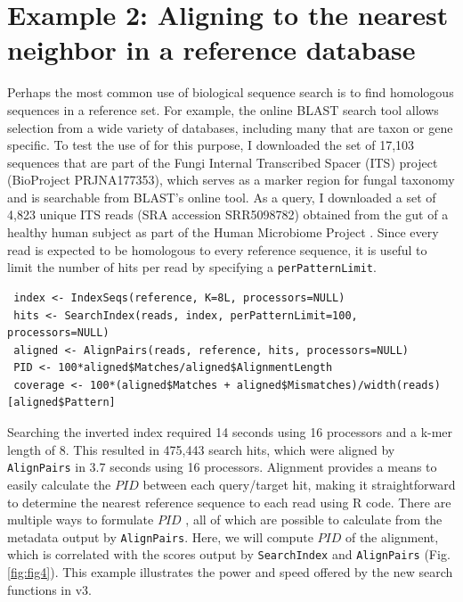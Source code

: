 \section{Example 2: Aligning to the nearest neighbor in a reference database}\label{example-2-aligning-to-the-nearest-neighbor-in-a-reference-database}

Perhaps the most common use of biological sequence search is to find homologous sequences in a reference set. For example, the online BLAST search tool allows selection from a wide variety of databases, including many that are taxon or gene specific. To test the use of  for this purpose, I downloaded the set of 17,103 sequences that are part of the Fungi Internal Transcribed Spacer (ITS) project (BioProject PRJNA177353), which serves as a marker region for fungal taxonomy \citep{RN4289} and is searchable from BLAST's online tool. As a query, I downloaded a set of 4,823 unique ITS reads (SRA accession SRR5098782) obtained from the gut of a healthy human subject as part of the Human Microbiome Project \citep{RN4288}. Since every read is expected to be homologous to every reference sequence, it is useful to limit the number of hits per read by specifying a \texttt{perPatternLimit}.

\begin{verbatim}
 index <- IndexSeqs(reference, K=8L, processors=NULL)
 hits <- SearchIndex(reads, index, perPatternLimit=100, processors=NULL)
 aligned <- AlignPairs(reads, reference, hits, processors=NULL)
 PID <- 100*aligned$Matches/aligned$AlignmentLength
 coverage <- 100*(aligned$Matches + aligned$Mismatches)/width(reads)[aligned$Pattern]
\end{verbatim}

Searching the inverted index required 14 seconds using 16 processors and a k-mer length of 8. This resulted in 475,443 search hits, which were aligned by \texttt{AlignPairs} in 3.7 seconds using 16 processors. Alignment provides a means to easily calculate the \(PID\) between each query/target hit, making it straightforward to determine the nearest reference sequence to each read using R code. There are multiple ways to formulate \(PID\) \citep{RN4290}, all of which are possible to calculate from the metadata output by \texttt{AlignPairs}. Here, we will compute \(PID\) of the alignment, which is correlated with the scores output by \texttt{SearchIndex} and \texttt{AlignPairs} (Fig. \ref{fig:fig4}). This example illustrates the power and speed offered by the new search functions in  v3.

